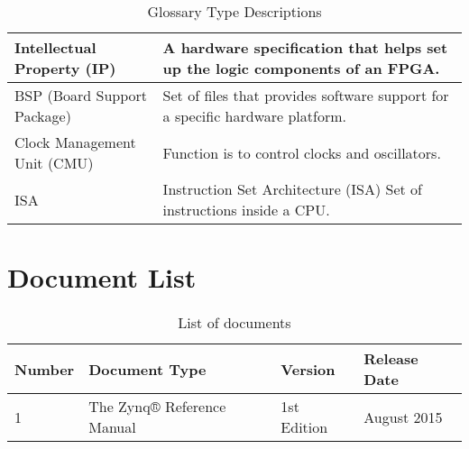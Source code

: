 \begin{table}[H]
\begin{tabularx}{\textwidth}{|p{2.2cm}  |X|}
            \hline
            Intellectual Property (IP) & A hardware specification that helps set up the logic components of an FPGA.\\
            \hline
            BSP (Board Support Package) & Set of files that provides software support for a specific hardware platform. \\
            \hline
            Clock Management Unit (CMU) & Function is to control clocks and oscillators. \\
            \hline
            ISA & Instruction Set Architecture (ISA) Set of instructions inside a CPU. \\
            \hline
		\end{tabularx}
		\caption{Glossary Type Descriptions}
		\label{tab:01Glossary Type Descriptions}
	\end{table}

 \section{Document List}
	\begin{table}[H]
		\centering
		\begin{tabularx}{\textwidth}{|p{3cm}|X|X|X|}
			\hline
			\textbf{Number} &  \textbf{Document Type} &  \textbf{Version} &  \textbf{Release Date}   \\
			\hline \hline
			1 &  The Zynq® Reference Manual  &  1st Edition & August 2015  \\
			\hline
		\end{tabularx}
		\caption{List of documents}
		\label{tab:01List of documents}
	\end{table}

 
 
 
 
 
 
     
 